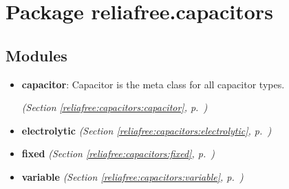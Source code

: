 %
%
%


\section{Package reliafree.capacitors}

    \label{reliafree:capacitors}


\subsection{Modules}

\begin{itemize}
\setlength{\parskip}{0ex}
\item \textbf{capacitor}: Capacitor is the meta class for all capacitor types.



  \textit{(Section \ref{reliafree:capacitors:capacitor}, p.~\pageref{reliafree:capacitors:capacitor})}

\item \textbf{electrolytic}
  \textit{(Section \ref{reliafree:capacitors:electrolytic}, p.~\pageref{reliafree:capacitors:electrolytic})}

\item \textbf{fixed}
  \textit{(Section \ref{reliafree:capacitors:fixed}, p.~\pageref{reliafree:capacitors:fixed})}

\item \textbf{variable}
  \textit{(Section \ref{reliafree:capacitors:variable}, p.~\pageref{reliafree:capacitors:variable})}

\end{itemize}



